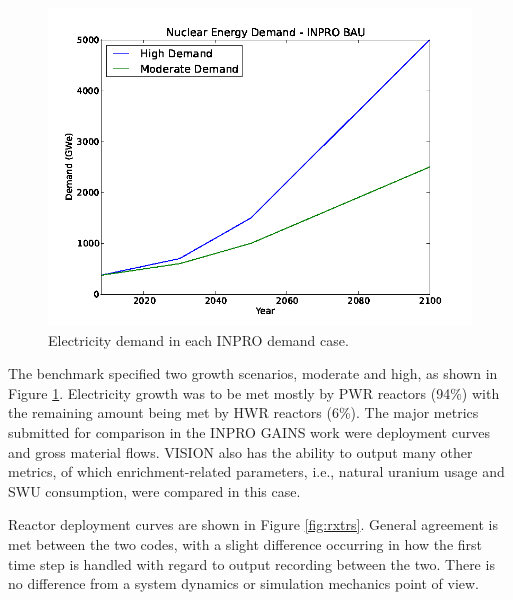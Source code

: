 \begin{figure}[ht]
  \includegraphics[width=\linewidth]{./chapters/prevwork/graphs/inpro-demand.png}
  \caption{Electricity demand in each INPRO demand case.}
  \label{fig:inpro-demand}
\end{figure}

The benchmark specified two growth scenarios, moderate and high, as shown in
Figure \ref{fig:inpro-demand}. Electricity growth was to be met mostly by PWR
reactors (94\%) with the remaining amount being met by HWR reactors (6\%). The
major metrics submitted for comparison in the INPRO GAINS work were deployment
curves and gross material flows. VISION also has the ability to output many
other metrics, of which enrichment-related parameters, i.e., natural uranium
usage and SWU consumption, were compared in this case.

Reactor deployment curves are shown in Figure \ref{fig:rxtrs}. General agreement
is met between the two codes, with a slight difference occurring in how the first
time step is handled with regard to output recording between the two. There is
no difference from a system dynamics or simulation mechanics point of view. 

